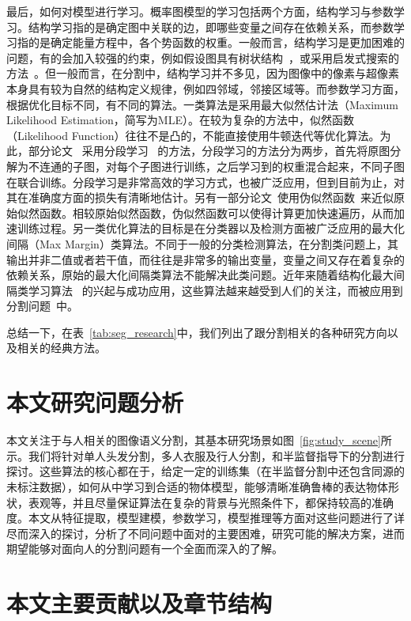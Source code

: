 最后，如何对模型进行学习。概率图模型的学习包括两个方面，结构学习与参数学习。结构学习指的是确定图中关联的边，即哪些变量之间存在依赖关系，而参数学习指的是确定能量方程中，各个势函数的权重。一般而言，结构学习是更加困难的问题，有的会加入较强的约束，例如假设图具有树状结构~\cite{treestruct}，或采用启发式搜索的方法~\cite{mutualcontext}。但一般而言，在分割中，结构学习并不多见，因为图像中的像素与超像素本身具有较为自然的结构定义规律，例如四邻域，邻接区域等。而参数学习方面，根据优化目标不同，有不同的算法。一类算法是采用最大似然估计法（Maximum Likelihood Estimation，简写为MLE）。在较为复杂的方法中，似然函数（Likelihood Function）往往不是凸的，不能直接使用牛顿迭代等优化算法。为此，部分论文~\cite{robusthighorder}\cite{textonboost} 采用分段学习~\cite{piecewisetrain} 的方法，分段学习的方法分为两步，首先将原图分解为不连通的子图，对每个子图进行训练，之后学习到的权重混合起来，不同子图在联合训练。分段学习是非常高效的学习方式，也被广泛应用，但到目前为止，对其在准确度方面的损失有清晰地估计。另有一部分论文~\cite{dtf}\cite{rtf}使用伪似然函数~\cite{pseudolikelihood}来近似原始似然函数。相较原始似然函数，伪似然函数可以使得计算更加快速遍历，从而加速训练过程。另一类优化算法的目标是在分类器以及检测方面被广泛应用的最大化间隔（Max Margin）类算法。不同于一般的分类检测算法，在分割类问题上，其输出并非二值或者若干值，而往往是非常多的输出变量，变量之间又存在着复杂的依赖关系，原始的最大化间隔类算法不能解决此类问题。近年来随着结构化最大间隔类学习算法~\cite{structuredsvm}\cite{m3n}\cite{approxtrain}\cite{lsvm}\cite{gclearn} 的兴起与成功应用，这些算法越来越受到人们的关注，而被应用到分割问题~\cite{svmseg1}\cite{gclearn}\cite{svmseg2}\cite{svmseg3}中。

总结一下，在表~\ref{tab:seg_research}中，我们列出了跟分割相关的各种研究方向以及相关的经典方法。

\section{本文研究问题分析}
本文关注于与人相关的图像语义分割，其基本研究场景如图~\ref{fig:study_scene}所示。我们将针对单人头发分割，多人衣服及行人分割，和半监督指导下的分割进行探讨。这些算法的核心都在于，给定一定的训练集（在半监督分割中还包含同源的未标注数据），如何从中学习到合适的物体模型，能够清晰准确鲁棒的表达物体形状，表观等，并且尽量保证算法在复杂的背景与光照条件下，都保持较高的准确度。本文从特征提取，模型建模，参数学习，模型推理等方面对这些问题进行了详尽而深入的探讨，分析了不同问题中面对的主要困难，研究可能的解决方案，进而期望能够对面向人的分割问题有一个全面而深入的了解。
\section{本文主要贡献以及章节结构}


